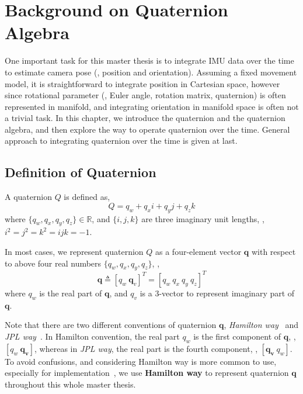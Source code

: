 \chapter{Background on Quaternion Algebra}
\label{chap:background}

One important task for this master thesis is to integrate IMU data over the time to estimate camera pose (\eg, position and orientation). Assuming a fixed movement model, it is straightforward to integrate position in Cartesian space, however since rotational parameter (\eg, Euler angle, rotation matrix, quaternion) is often represented in manifold, and integrating orientation in manifold space is often not a trivial task. In this chapter, we introduce the quaternion and the quaternion algebra, and then explore the way to operate quaternion over the time. General approach to integrating quaternion over the time is given at last.

\section{Definition of Quaternion}
\label{sec:def_of_quat}

A quaternion $Q$ is defined as,
\begin{equation}\label{q1}
	Q = q_w + q_xi + q_yj + q_zk
\end{equation}
where $\{q_w,q_x,q_y,q_z\} \in \mathbb{R}$, and $\{i,j,k\}$ are three imaginary unit lengths, \ie, $i^2=j^2=k^2=ijk=-1$.

In most cases, we represent quaternion $Q$ as a four-element vector $\textbf{q}$ with respect to above four real numbers $\{q_w,q_x,q_y,q_z\}$, \ie,
\begin{equation}\label{q2}
	\mathbf{q} \triangleq \left[q_w \ \mathbf{q}_v\right]^T = \left[q_w \ q_x \ q_y \ q_z \right]^T
\end{equation}
where $q_w$ is the real part of $\textbf{q}$, and $q_v$ is a 3-vector to represent imaginary part of $\textbf{q}$. 

Note that there are two different conventions of quaternion $\textbf{q}$, \textit{Hamilton way}~\cite{hamilton1844ii} and \textit{JPL way}~\cite{breckenridge1999quaternions}. In Hamilton convention, the real part $q_w$ is the first component of $\textbf{q}$, \ie, $\left[q_w \ \mathbf{q_v}\right]$, whereas in \textit{JPL way}, the real part is the fourth component, \ie, $\left[\mathbf{q_v} \ q_w\right]$. To avoid confusions, and considering Hamilton way is more common to use, especially for implementation~\cite{guennebaud2010eigen, hess2007essential}, we use \textbf{Hamilton way} to represent quaternion $\textbf{q}$ throughout this whole master thesis. 

